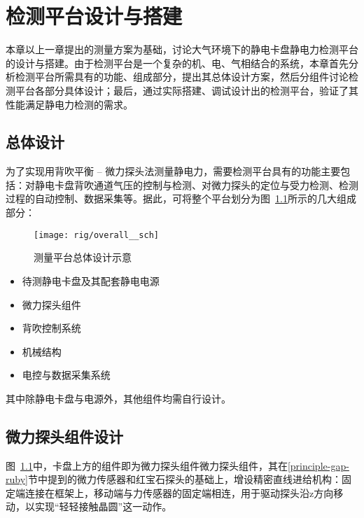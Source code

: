 \chapter{检测平台设计与搭建}\label{ch:rig}

本章以上一章提出的测量方案为基础，讨论大气环境下的静电卡盘静电力检测平台的设计与搭建。由于检测平台是一个复杂的机、电、气相结合的系统，本章首先分析检测平台所需具有的功能、组成部分，提出其总体设计方案，然后分组件讨论检测平台各部分具体设计；最后，通过实际搭建、调试设计出的检测平台，验证了其性能满足静电力检测的需求。



\section{总体设计}\label{sec:rig-overall}

为了实现用背吹平衡 -- 微力探头法测量静电力，需要检测平台具有的功能主要包括：对静电卡盘背吹通道气压的控制与检测、对微力探头的定位与受力检测、检测过程的自动控制、数据采集等。据此，可将整个平台划分为图~\ref{fig:rig-overall-sch}所示的几大组成部分：

\begin{figure}[tbh]
\centering
\texttt{[image: rig/overall\_\_sch]}
\caption{测量平台总体设计示意}
\label{fig:rig-overall-sch}
\end{figure}

\begin{itemize}
  \item 待测静电卡盘及其配套静电电源
  \item 微力探头组件
  \item 背吹控制系统
  \item 机械结构
  \item 电控与数据采集系统
\end{itemize}

其中除静电卡盘与电源外，其他组件均需自行设计。



\clearpage



\section{微力探头组件设计}\label{sec:rig-probe}

图~\ref{fig:rig-overall-sch}中，卡盘上方的组件即为微力探头组件微力探头组件，其在\ref{principle-gap-ruby}节中提到的微力传感器和红宝石探头的基础上，增设精密直线进给机构：固定端连接在框架上，移动端与力传感器的固定端相连，用于驱动探头沿z方向移动，以实现“轻轻接触晶圆”这一动作。



